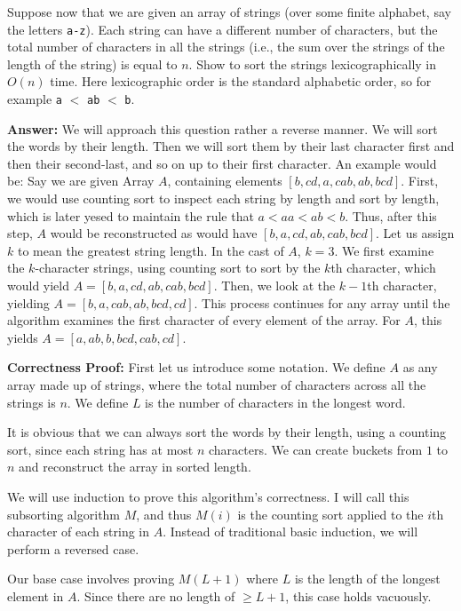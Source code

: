 \documentclass[11pt]{article}
\begin{document}
Suppose now that we are given an array of strings (over some finite alphabet, say the letters {\tt a-z}). 
Each string can have a different number of characters, but the total number of characters in all the strings 
(i.e., the sum over the strings of the length of the string) is equal to $n$. 
Show to sort the strings lexicographically in $O(n)$ time.  Here lexicographic order is the standard alphabetic order, 
so for example {\tt a} $<$ {\tt ab} $<$ {\tt b}.

\bigbreak

\textbf{Answer:} 
We will approach this question rather a reverse manner. We will sort the words by their length. 
Then we will sort them by their last character first and then their second-last, and so on up to their first character. 
An example would be: Say we are given Array $A$, containing elements $[b, cd, a, cab, ab, bcd]$. 
First, we would use counting sort to inspect each string by length and sort by length, 
which is later yesed to maintain the rule that $a < aa < ab < b$. 
Thus, after this step, $A$ would be reconstructed as  would have $[b, a, cd, ab, cab, bcd]$. 
Let us assign $k$ to mean the greatest string length. In the cast of $A$, $k=3$. 
We first examine the $k$-character strings, using counting sort to sort by the $k$th character, which would yield $A = [b, a, cd, ab, cab, bcd]$. 
Then, we look at the $k-1$th character, yielding $A = [b, a, cab, ab, bcd, cd]$. 
This process continues for any array until the algorithm examines the first character of every element of the array. 
For $A$, this yields $A = [a, ab, b, bcd, cab, cd]$.

\textbf{Correctness Proof:} 
First let us introduce some notation. We define $A$ as any array made up of strings, where the total number of characters across all the strings is $n$. 
We define $L$ is the number of characters in the longest word.

It is obvious that we can always sort the words by their length, using a counting sort, since each string has at most $n$ characters. 
We can create buckets from $1$ to $n$ and reconstruct the array in sorted length. 

We will use induction to prove this algorithm's correctness. I will call this subsorting algorithm $M$, and thus $M(i)$ is the counting sort applied to 
the $i$th character of each string in $A$. Instead of traditional basic induction, we will perform a reversed case. 

Our base case involves proving $M(L+1)$ where $L$ is the length of the longest element in $A$. 
Since there are no length of $\geq L+1$, this case holds vacuously. 
\end{document}

